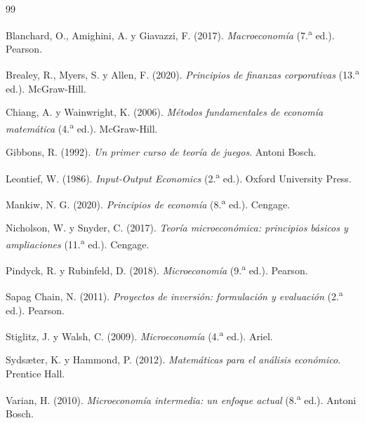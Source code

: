 \documentclass[11pt,a4paper,oneside]{report}
\theoremstyle{definition}
\begin{document}
\begin{thebibliography}{99}

Blanchard, O., Amighini, A. y Giavazzi, F. (2017). \textit{Macroeconomía} (7.\textsuperscript{a} ed.). Pearson.

Brealey, R., Myers, S. y Allen, F. (2020). \textit{Principios de finanzas corporativas} (13.\textsuperscript{a} ed.). McGraw-Hill.

Chiang, A. y Wainwright, K. (2006). \textit{Métodos fundamentales de economía matemática} (4.\textsuperscript{a} ed.). McGraw-Hill.

Gibbons, R. (1992). \textit{Un primer curso de teoría de juegos}. Antoni Bosch.

Leontief, W. (1986). \textit{Input-Output Economics} (2.\textsuperscript{a} ed.). Oxford University Press.

Mankiw, N. G. (2020). \textit{Principios de economía} (8.\textsuperscript{a} ed.). Cengage.

Nicholson, W. y Snyder, C. (2017). \textit{Teoría microeconómica: principios básicos y ampliaciones} (11.\textsuperscript{a} ed.). Cengage.

Pindyck, R. y Rubinfeld, D. (2018). \textit{Microeconomía} (9.\textsuperscript{a} ed.). Pearson.

Sapag Chain, N. (2011). \textit{Proyectos de inversión: formulación y evaluación} (2.\textsuperscript{a} ed.). Pearson.

Stiglitz, J. y Walsh, C. (2009). \textit{Microeconomía} (4.\textsuperscript{a} ed.). Ariel.

Sydsæter, K. y Hammond, P. (2012). \textit{Matemáticas para el análisis económico}. Prentice Hall.

Varian, H. (2010). \textit{Microeconomía intermedia: un enfoque actual} (8.\textsuperscript{a} ed.). Antoni Bosch.

\end{thebibliography}
\end{document}
